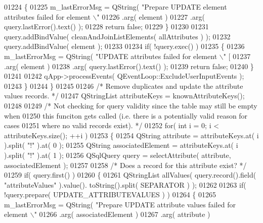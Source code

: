 \begin{DoxyCode}
{{{{{{{{{{{{{{{{{{{{{{{{{{{{{{{{{{{{{{{{{{{{{01224       \{
01225         m\_lastErrorMsg = QString( \textcolor{stringliteral}{"Prepare UPDATE element attributes failed for
       element \(\backslash\)"%
01226                          .arg( element )
01227                          .arg( query.lastError().text() );
01228         \textcolor{keywordflow}{return} \textcolor{keyword}{false};
01229       \}
01230 
01231       query.addBindValue( cleanAndJoinListElements( allAttributes ) );
01232       query.addBindValue( element );
01233 
01234       \textcolor{keywordflow}{if}( !query.exec() )
01235       \{
01236         m\_lastErrorMsg = QString( \textcolor{stringliteral}{"UPDATE attributes failed for element \(\backslash\)"%
       [%
01237                          .arg( element )
01238                          .arg( query.lastError().text() );
01239         \textcolor{keywordflow}{return} \textcolor{keyword}{false};
01240       \}
01241 
01242       qApp->processEvents( QEventLoop::ExcludeUserInputEvents );
01243     \}
01244   \}
01245 
01246   \textcolor{comment}{/* Remove duplicates and update the attribute values records. */}
01247   QStringList attributeKeys = knownAttributeKeys();
01248 
01249   \textcolor{comment}{/* Not checking for query validity since the table may still be empty when}
01250 \textcolor{comment}{    this funciton gets called (i.e. there is a potentially valid reason for
       cases}
01251 \textcolor{comment}{    where no valid records exist). */}
01252   \textcolor{keywordflow}{for}( \textcolor{keywordtype}{int} i = 0; i < attributeKeys.size(); ++i )
01253   \{
01254     QString attribute         = attributeKeys.at( i ).split( \textcolor{stringliteral}{"!"} ).at( 0 );
01255     QString associatedElement = attributeKeys.at( i ).split( \textcolor{stringliteral}{"!"} ).at( 1 );
01256     QSqlQuery query = selectAttribute( attribute, associatedElement );
01257 
01258     \textcolor{comment}{/* Does a record for this attribute exist? */}
01259     \textcolor{keywordflow}{if}( query.first() )
01260     \{
01261       QStringList allValues( query.record().field( \textcolor{stringliteral}{"attributeValues"} ).value().
      toString().split( SEPARATOR ) );
01262 
01263       \textcolor{keywordflow}{if}( !query.prepare( UPDATE\_ATTRIBUTEVALUES ) )
01264       \{
01265         m\_lastErrorMsg = QString( \textcolor{stringliteral}{"Prepare UPDATE attribute values failed for
       element \(\backslash\)"%
01266                          .arg( associatedElement )
01267                          .arg( attribute )
}}}}}}}}}}}}}}}}}}}}}}}}}}}}}}}}}}}}}}}}}}}}}}}}
\end{DoxyCode}
